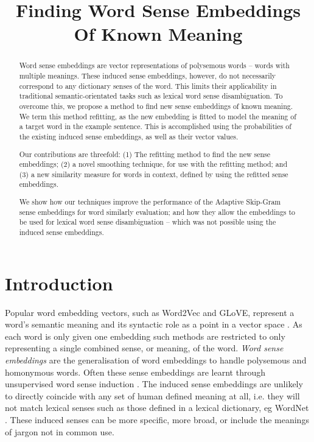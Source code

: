 \documentclass{article}
\def\parencite{\cite}
\begin{document}
\title{Finding Word Sense Embeddings Of Known Meaning}


\maketitle

\begin{abstract}
Word sense embeddings are vector representations of polysemous words -- words with multiple meanings.
These induced sense embeddings, however, do not necessarily correspond to any dictionary senses of the word.
This limits their applicability in traditional semantic-orientated tasks such as lexical word sense disambiguation.
To overcome this, we propose a method to find new sense embeddings of known meaning.
We term this method refitting, as the new embedding is fitted to model the meaning of a target word in the example sentence.
This is accomplished using the probabilities of the existing induced sense embeddings, as well as their vector values.

Our contributions are threefold:
(1) The refitting method to find the new sense embeddings;
 (2) a novel smoothing technique, for use with the refitting method;
and (3) a new similarity measure for words in context, defined by using the refitted sense embeddings.

We show how our techniques improve the performance of the Adaptive Skip-Gram sense embeddings for word similarly evaluation; and how they allow the embeddings to be used for lexical word sense disambiguation -- which was not possible using the induced sense embeddings.
\end{abstract}


\section{Introduction}


Popular word embedding vectors, such as Word2Vec and GLoVE, represent a word's semantic meaning and its syntactic role as a point in a vector space \parencite{mikolov2013efficient,pennington2014glove}. As each word is only given one embedding such methods are restricted to only representing a single combined sense, or meaning, of the word. \emph{Word sense embeddings} are the generalisation of word embeddings to handle polysemous and homonymous  words. Often these sense embeddings are learnt through unsupervised word sense induction \parencite{Reisinger2010,Huang2012,tian2014probabilistic,AdaGrams}. The induced sense embeddings are unlikely to directly coincide with any set of human defined meaning at all, i.e. they will not match lexical senses such as those defined in a lexical dictionary, eg WordNet \parencite{miller1995wordnet}. These induced senses can be more specific, more broad, or include the meanings of jargon not in common use.
\end{document}
